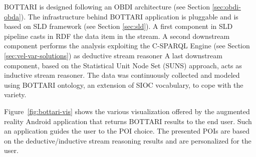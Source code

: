 BOTTARI is designed following an OBDI architecture (see Section \ref{sec:obdi-obda}). 
The infrastructure behind BOTTARI application is pluggable and is based on SLD framework (see Section \ref{sec:sld}). 
A first component in SLD pipeline casts in RDF the data item in the stream. 
A second downstream component performs the analysis exploiting the C-SPARQL Engine (see Section \ref{sec:vel-var-solutions}) as deductive stream reasoner
A last downstream component, based on the Statistical Unit Node Set (SUNS) \cite{tresp2009materializing,huang2010multivariate} approach, acts as inductive stream reasoner.
The data was continuously collected and modeled using BOTTARI ontology, an extension of SIOC vocabulary, to cope with the variety.

Figure~\ref{fig:bottari-vis} shows the various visualization offered by the augmented reality Android application that returns BOTTARI results to the end user. Such an application guides the user to the POI choice. The presented POIs are based on the deductive/inductive stream reasoning results and are personalized for the user.